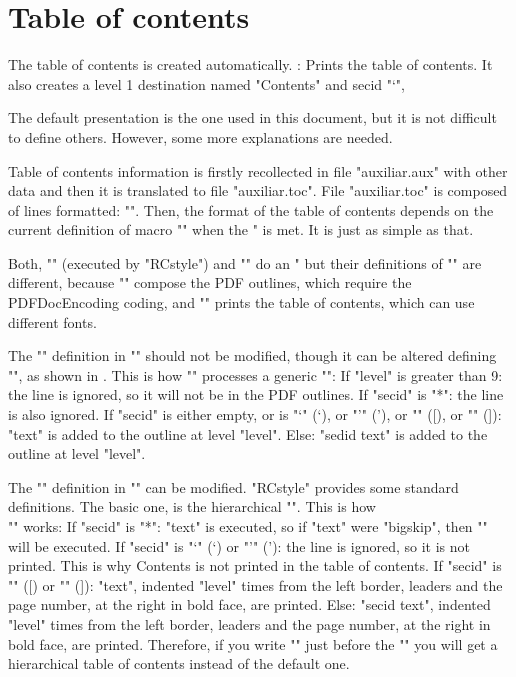 \section{Table of contents}

The table of contents is created automatically.
\command\maketoc:  Prints the table of contents. It also creates
 a level 1 destination named "Contents" and {\sc secid} "\lq",

The default presentation is the one used in this document,
but it is not difficult to define others.
However, some more explanations are needed.

Table of contents information is firstly recollected
in file "auxiliar.aux" with other data and then
it is translated to file "auxiliar.toc".
File "auxiliar.toc" is composed of lines formatted:
"".
Then, the format of the table of contents depends
on the current definition of macro "\tocline"
when the " is met.
It is just as simple as that.

Both, "\files" (executed by "RCstyle") and "\maketoc"
do an "
but their definitions of "\tocline" are different,
because "\files" compose the PDF outlines,
which require the PDFDocEncoding coding, and "\maketoc"
prints the table of contents, which can use different fonts.

The "\tocline" definition in "\files"
should not be modified, though it can be altered
defining "\doextrapdf", as shown in .
This is how "\files" processes a generic
"":
\beginpoints
\point If "level" is greater than 9: the line is ignored, so it will not be
 in the PDF outlines.
\point If "secid" is "*": the line is also ignored.
\point If "secid" is either empty,
 or is "\lq" (`), or  "\rq" ('), or "\lbrack" ([), or "\lbrack" (]):
 "text" is added to the outline at level "level".
\point Else: "sedid text" is added to the outline at level "level".
\endpoints

The "\tocline" definition in "\maketoc" can be modified.
"RCstyle" provides some standard definitions.
The basic one, is the hierarchical "\toclineX". This is how\\
"" works:
\beginpoints
\point If "secid" is "*": "\csname text\endcsname" is executed,
 so if "text" were "bigskip", then "\bigskip" will be executed.
\point If "secid" is "\lq" (`) or "\rq" ('): the line is ignored,
 so it is not printed.
 This is why Contents is not printed in the table of contents.
\point If "secid" is "\lbrack" ([) or "\rbrack" (]):
 "text", indented "level" times from the left border,
 leaders and the page number, at the right in bold face, are printed.
\point Else: "secid text", indented "level" times from the left border,
 leaders and the page number, at the right in bold face, are printed.
\endpoints
Therefore, if you write "\let\tocline=\toclineX" just before the
"\maketoc" you will get a hierarchical table of contents
instead of the default one.

